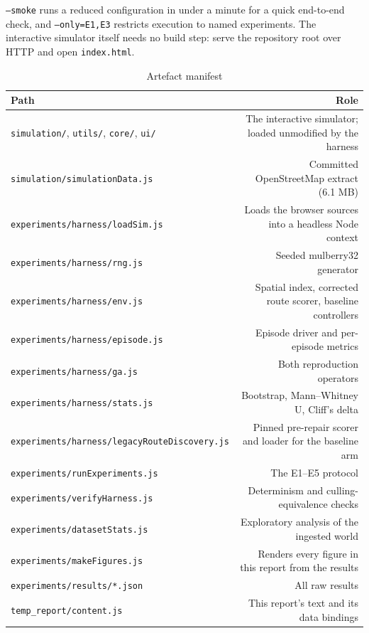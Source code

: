 \documentclass[conference]{IEEEtran}
\begin{document}
\texttt{--smoke} runs a reduced configuration in under a minute for a quick end-to-end check, and \texttt{--only=E1,E3} restricts execution to named experiments. The interactive simulator itself needs no build step: serve the repository root over HTTP and open \texttt{index.html}.

\begin{table}[!t]
\caption{Artefact manifest}
\label{tab:manifest}
\centering
\footnotesize
\begin{tabular}{lr}
\toprule
Path & Role \\
\midrule
\texttt{simulation/}, \texttt{utils/}, \texttt{core/}, \texttt{ui/} & The interactive simulator; loaded unmodified by the harness \\
\texttt{simulation/simulationData.js} & Committed OpenStreetMap extract (6.1 MB) \\
\texttt{experiments/harness/loadSim.js} & Loads the browser sources into a headless Node context \\
\texttt{experiments/harness/rng.js} & Seeded mulberry32 generator \\
\texttt{experiments/harness/env.js} & Spatial index, corrected route scorer, baseline controllers \\
\texttt{experiments/harness/episode.js} & Episode driver and per-episode metrics \\
\texttt{experiments/harness/ga.js} & Both reproduction operators \\
\texttt{experiments/harness/stats.js} & Bootstrap, Mann–Whitney U, Cliff's delta \\
\texttt{experiments/harness/legacyRouteDiscovery.js} & Pinned pre-repair scorer and loader for the baseline arm \\
\texttt{experiments/runExperiments.js} & The E1–E5 protocol \\
\texttt{experiments/verifyHarness.js} & Determinism and culling-equivalence checks \\
\texttt{experiments/datasetStats.js} & Exploratory analysis of the ingested world \\
\texttt{experiments/makeFigures.js} & Renders every figure in this report from the results \\
\texttt{experiments/results/*.json} & All raw results \\
\texttt{temp\_report/content.js} & This report's text and its data bindings \\
\bottomrule
\end{tabular}
\end{table}
\end{document}
